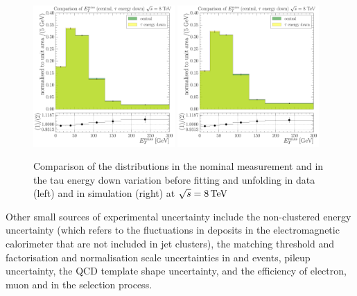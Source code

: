 \begin{figure}[hbtp]
    \centering
     \includegraphics[width=0.48\textwidth]{Chapters/04_Analysis/04b_XSections/images/tau_cross_checks/compare_central_MET_to_tau_energy_down_asym_bins_electron_channel_data.pdf}\hfill
     \includegraphics[width=0.48\textwidth]{Chapters/04_Analysis/04b_XSections/images/tau_cross_checks/compare_central_MET_to_tau_energy_down_asym_bins_electron_channel_TTJet.pdf}
     \caption{Comparison of the \met distributions in the nominal measurement and in the tau energy down
     variation before fitting and unfolding in data (left) and in \ttbar simulation (right) at
     $\sqrt{s}=8\,\text{Te\hspace{-.08em}V}$}
     \label{fig:tau_down_comparison}
\end{figure}
 


Other small sources of experimental uncertainty include the non-clustered energy uncertainty (which refers to
the fluctuations in deposits in the electromagnetic calorimeter that are not included in jet clusters), the
matching threshold and factorisation and normalisation scale uncertainties in \WpJets and \ZpJets events,
pileup uncertainty, the QCD template shape uncertainty, and the efficiency of electron, muon and \btagging in
the selection process.

